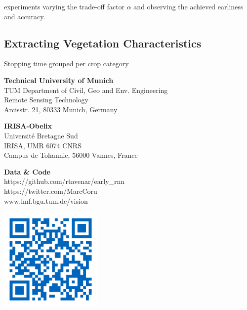 \documentclass[a0]{tumposter}
\begin{document}
\begin{minipage}[t]{.32\textwidth}
\begin{table}
		experiments varying the trade-off factor $\alpha$ and observing the achieved earliness and accuracy.
	
		
	\end{table}
	
	
	\subsection{Extracting Vegetation Characteristics}
	
	Stopping time grouped per crop category 
	
	
%	
%	
%	
	
\end{minipage}

\begin{footer}
	\begin{minipage}{.33\textwidth}
		\textbf{Technical University of Munich}\footnotemark[1]\\
		TUM Department of Civil, Geo and Env. Engineering \\
		Remote Sensing Technology \\
		Arcisstr. 21, 80333 Munich, Germany
	\end{minipage}
	\begin{minipage}{.33\textwidth}
		\textbf{IRISA-Obelix}\footnotemark[2]\\
		Université Bretagne Sud \\
		IRISA, UMR 6074 CNRS \\
		Campus de Tohannic, 56000 Vannes, France
		
	\end{minipage}
	\begin{minipage}{.23\textwidth}
		\textbf{Data \& Code} \\
		{https://github.com/rtavenar/early\_rnn} \\
		{https://twitter.com/MarcCoru} \\
		www.lmf.bgu.tum.de/vision
	\end{minipage}
	\begin{minipage}{.10\textwidth}
		\hfill\includegraphics[width=5cm]{images/qr-code}\\
		
	\end{minipage}
	
	
\end{footer}
\end{document}
